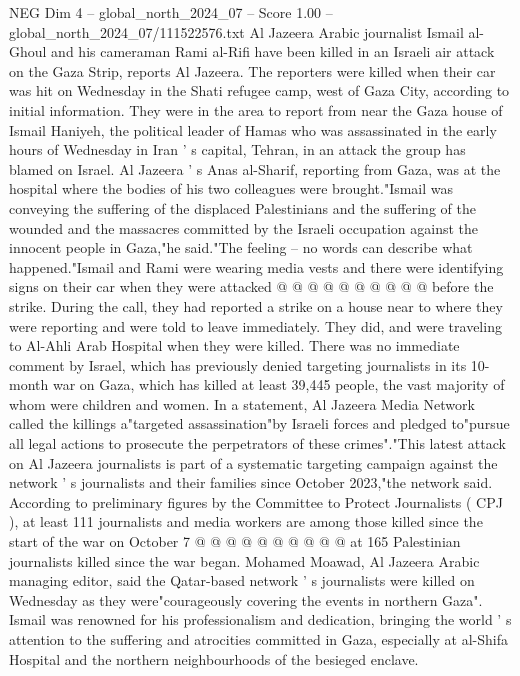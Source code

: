 \begin{textsample}{NEG Dim 4 – global\_north\_2024\_07 – Score 1.00 – global\_north\_2024\_07/111522576.txt}  \label{ex:f4_neg_262}
Al Jazeera Arabic journalist Ismail al-Ghoul and his cameraman Rami al-Rifi have been killed in an Israeli air attack on the Gaza Strip, reports Al Jazeera.
The reporters were killed when their car was hit on Wednesday in the Shati refugee camp, west of Gaza City, according to initial information.
They were in the area to report from near the Gaza house of Ismail Haniyeh, the political leader of Hamas who was assassinated in the early hours of Wednesday in Iran ' s capital, Tehran, in an attack the group has blamed on Israel.
Al Jazeera ' s Anas al-Sharif, reporting from Gaza, was at the hospital where the bodies of his two colleagues were brought."Ismail was conveying the suffering of the displaced Palestinians and the suffering of the wounded and the massacres committed by the Israeli occupation against the innocent people in Gaza,"he said."The feeling -- no words can describe what happened."Ismail and Rami were wearing media vests and there were identifying signs on their car when they were attacked @ @ @ @ @ @ @ @ @ @ before the strike.
During the call, they had reported a strike on a house near to where they were reporting and were told to leave immediately.
They did, and were traveling to Al-Ahli Arab Hospital when they were killed.
There was no immediate comment by Israel, which has previously denied targeting journalists in its 10-month war on Gaza, which has killed at least 39,445 people, the vast majority of whom were children and women.
In a statement, Al Jazeera Media Network called the killings a"targeted assassination"by Israeli forces and pledged to"pursue all legal actions to prosecute the perpetrators of these crimes"."This latest attack on Al Jazeera journalists is part of a systematic targeting campaign against the network ' s journalists and their families since October 2023,"the network said.
According to preliminary figures by the Committee to Protect Journalists ( CPJ ), at least 111 journalists and media workers are among those killed since the start of the war on October 7 @ @ @ @ @ @ @ @ @ @ at 165 Palestinian journalists killed since the war began.
Mohamed Moawad, Al Jazeera Arabic managing editor, said the Qatar-based network ' s journalists were killed on Wednesday as they were"courageously covering the events in northern Gaza".
Ismail was renowned for his professionalism and dedication, bringing the world ' s attention to the suffering and atrocities committed in Gaza, especially at al-Shifa Hospital and the northern neighbourhoods of the besieged enclave.

\end{textsample}
